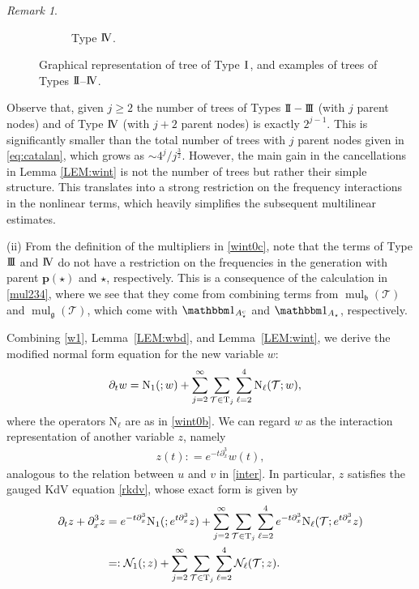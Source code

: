 \documentclass[a4paper,
11pt,  reqno]{amsart}
\makeatletter
\newcommand{\I}{\hspace{0.2mm}\textup{I}\hspace{0.2mm}}
\newcommand{\II}{\textup{I \hspace{-2.9mm} I} }
\newcommand{\III}{\textup{I \hspace{-2.9mm} I \hspace{-2.9mm} I}}
\newcommand{\IV}{\textup{I \hspace{-2.9mm} V}}
\newcommand{\5}{\textup{V}}
\newcommand{\noi}{\noindent}
\newcommand{\ind}{\mathbbm 1}
\newcommand{\dx}{\partial_x}
\newcommand{\dt}{\partial_t}
\theoremstyle{remark}
\newtheorem{remark}[theorem]{Remark}
\newcommand{\TT}{\mathcal{T}}
\newcommand{\Tr}{\mathrm{T}}
\newcommand{\bfrak}{\mathfrak{b}}
\newcommand{\gfrak}{\mathfrak{g}}
\newcommand{\pb}{\mathbf{p}}
\renewcommand{\l}{\ell}
\DeclareMathOperator{\mul}{mul}
\def\<#1>{\csname MH@symb@#1\endcsname}
\numberwithin{equation}{section}
\numberwithin{theorem}{section}
\newcommand{\NN}{\mathrm{N}}
\newcommand{\Ncal}{\mathcal{N}}
\makeatother
\begin{document}
\begin{remark}
\begin{figure}[!h]
\begin{subfigure}[b]{0.2\textwidth}
\caption{Type $\IV$.}
\end{subfigure}
\caption{Graphical representation of tree of Type $\I$, and examples of trees of Types $\II$--$\IV$. }
\label{FIG:types}
\end{figure}
\noi Observe that, given $j\ge 2$ the number of trees of Types $\II-\III$ (with $j$ parent nodes) and of Type $\IV$ (with $j+2$ parent nodes) is exactly $2^{j-1}$. This is significantly smaller than the total number of trees with $j$ parent nodes given in \eqref{eq:catalan}, which grows as $\sim 4^j/j^{\frac32}$. However, the main gain in the cancellations in Lemma \ref{LEM:wint} is not the number of trees but rather their simple structure. This translates into a strong restriction on the frequency interactions in the nonlinear terms, which heavily simplifies the subsequent multilinear estimates.


\medskip

\noi (ii) From the definition of the multipliers in \eqref{wint0c}, note that the terms of Type $\III$ and $\IV$ do not have a restriction on the frequencies in the generation with parent $\pb(\star)$ and $\star$, respectively. This is a consequence of the calculation in \eqref{mul234}, where we see that they come from combining terms from $\mul_\bfrak(\TT)$ and $\mul_{\gfrak}(\TT)$, which come with $\ind_{A_{\star}^c} $ and $\ind_{A_\star}$, respectively.  


\end{remark}


Combining \eqref{w1}, Lemma~\ref{LEM:wbd}, and Lemma~\ref{LEM:wint}, we derive the modified normal form equation for the new variable $w$:
\begin{align}
\label{w2}
\dt w & =  \NN_1(\<1>;w) + \sum_{j=2}^\infty \sum_{\TT \in \Tr_j} \sum_{\l=2}^4  \NN_\l(\TT;w),
\end{align}
where the operators $\NN_\l$ are as in \eqref{wint0b}. 
We can regard $w$ as the interaction representation of another variable $z$, namely 
\begin{align}
\label{z0}
z(t) : = e^{-t\dx^3} w(t),
\end{align}
analogous to the relation between $u$ and $v$ in \eqref{inter}. In particular, $z$ satisfies the gauged KdV equation \eqref{rkdv}, whose exact form is given by
\begin{align}
\label{z1}
\dt z 
+ \dx^3 z
&
= 
e^{-t\dx^3}
\NN_1(\<1>;e^{t\partial_x^3}z) 
+ 
\sum_{j=2}^\infty \sum_{\TT \in \Tr_j} \sum_{\l=2}^4  
e^{-t\dx^3}
\NN_\l(\TT;e^{t\partial_x^3}z)
\\
&
=: 
\Ncal_1(\<1>;z) + \sum_{j=2}^\infty \sum_{\TT \in \Tr_j} \sum_{\l=2}^4  \Ncal_\l(\TT;z)
.
\end{align}
\end{document}
